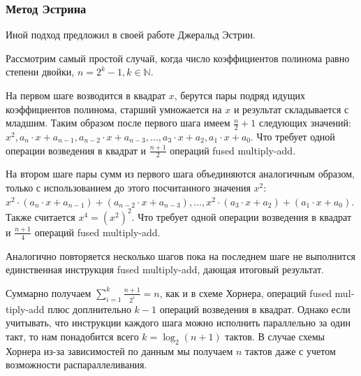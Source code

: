 \subsubsection{Метод Эстрина}

Иной подход предложил в своей работе Джеральд Эстрин\cite{estrin}.

Рассмотрим самый простой случай, когда число коэффициентов полинома равно степени двойки, $n = 2^{k} - 1, k \in \mathbb{N}$.

На первом шаге возводится в квадрат $x$, берутся пары подряд идущих коэффициентов полинома, старший умножается на $x$ и результат складывается с младшим. 
Таким образом после первого шага имеем $\frac{n}{2}+1$ следующих значений: $x^{2}, a_{n} \cdot x + a_{n-1}, a_{n-2} \cdot x + a_{n-3}, \ldots , a_{3} \cdot x + a_{2}, a_{1} \cdot x + a_{0}$.
Что требует одной операции возведения в квадрат и $\frac{n+1}{2}$ операций  \foreignlanguage{english}{fused multiply-add}.

На втором шаге пары сумм из первого шага объединяются аналогичным образом, только с использованием до этого посчитанного значения $x^{2}$: $x^{2} \cdot (a_{n} \cdot x + a_{n-1}) + (a_{n-2} \cdot x + a_{n-3}), \ldots, x^{2} \cdot ( a_{3} \cdot x + a_{2}) + (a_{1} \cdot x + a_{0})$.
Также считается $x^{4} = (x^{2})^{2}$.
Что требует одной операции возведения в квадрат и $\frac{n+1}{4}$ операций  \foreignlanguage{english}{fused multiply-add}.

Аналогично повторяется несколько шагов пока на последнем шаге не выполнится единственная инструкция \foreignlanguage{english}{fused multiply-add}, дающая итоговый результат.

Суммарно получаем $\sum_{i=1}^{k} \frac{n+1}{2^{i}} = n$, как и в схеме Хорнера, операций \foreignlanguage{english}{fused multiply-add} плюс доплнительно $k-1$ операций возведения в квадрат.
Однако если учитывать, что инструкции каждого шага можно исполнить параллельно за один такт, то нам понадобится всего $k = \log_{2} (n+1)$ тактов.
В случае схемы Хорнера из-за зависимостей по данным мы получаем $n$ тактов даже с учетом возможности распараллеливания.

